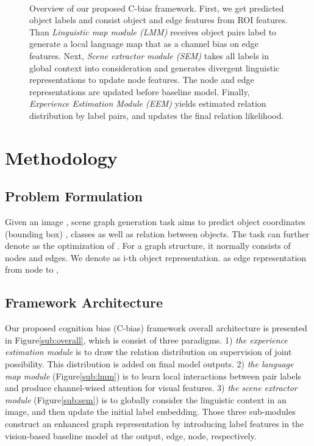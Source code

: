 \documentclass[runningheads]{llncs}
\begin{document}
\begin{figure}[t!]
  \\
  \quad
  \caption{Overview of our proposed C-bias framework. First, we get
    predicted object labels and consist object and edge features from ROI features.
    Than \textit{Linguistic map module (LMM)} receives object pairs label to
    generate a local language map that as a channel bias on edge features. Next,
    \textit{Scene extractor module (SEM)} takes all labels in global context into
    consideration and generates divergent linguistic representations to update node
    features. The node and edge representations are updated before baseline model.
    Finally, \textit{Experience Estimation Module (EEM)} yields estimated relation
    distribution by label pairs, and updates the final relation likelihood.}
  \label{net}
\end{figure}

\section{Methodology}
\subsection{Problem Formulation}
Given an image , scene graph generation task aims to predict object
coordinates (bounding box)  , classes 
as well as relation  between objects. The task can further denote as the
optimization of . For a graph structure, it
normally consists of nodes and edges. We denote  as
i-th object representation.  as edge representation
from node  to ,

\subsection{Framework Architecture}
Our proposed cognition bias (C-bias) framework overall architecture is
presented in Figure\ref{sub:overall}, which is consist of three paradigms. 1)
\textit{the experience estimation module} is to draw the relation distribution
on supervision of joint possibility. This distribution is added on final model
outputs. 2) \textit{the language map module} (Figure\ref{sub:lmm}) is to learn
local interactions between pair labels and produce channel-wised attention for
visual features. 3) \textit{the scene extractor module} (Figure\ref{sub:sem})
is to globally consider the linguistic context in an image, and then update the
initial label embedding. Those three sub-modules construct an enhanced graph
representation by introducing label features in the vision-based baseline model
at the output, edge, node, respectively.
\setcounter{secnumdepth}{3}
\end{document}
